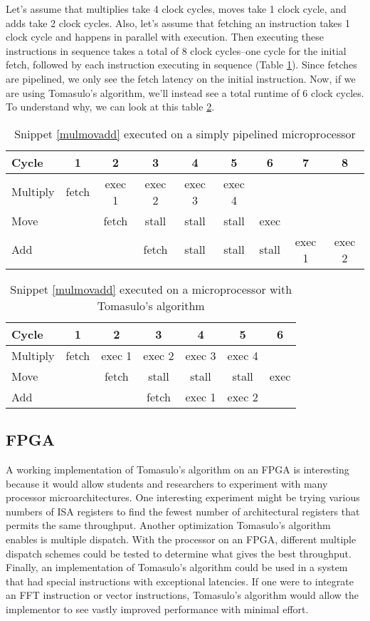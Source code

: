 \documentclass[12pt]{article}
\begin{document}
Let's assume that multiplies take 4 clock cycles, moves take 1 clock cycle, and adds take 2 clock cycles. Also, let's assume that fetching an instruction takes 1 clock cycle
and happens in parallel with execution. Then executing these instructions in sequence takes a total of 8 clock cycles--one cycle for the initial fetch, followed by each instruction
executing in sequence (Table \ref{simpleex1}). Since fetches are pipelined, we only see the fetch latency on the initial instruction. Now, if we are using Tomasulo's algorithm, we'll instead
see a total runtime of 6 clock cycles. To understand why, we can look at this table \ref{tomasuloex1}.

\begin{table}
\begin{tabular}{l || c | c | c | c | c | c | c | c}
Cycle & 1 & 2 & 3 & 4 & 5 & 6  & 7 & 8 \\ \hline
Multiply & fetch & exec 1 & exec 2 & exec 3 & exec 4 & & \\
Move & & fetch & stall & stall & stall & exec & \\
Add & & & fetch & stall & stall & stall & exec 1 & exec 2 \\
\end {tabular}
\caption{Snippet \ref{mulmovadd} executed on a simply pipelined microprocessor}
\label{simpleex1}
\end{table}

\begin{table}
\begin{tabular}{l || c | c | c | c | c | c}
Cycle & 1 & 2 & 3 & 4 & 5 & 6 \\ \hline
Multiply & fetch & exec 1 & exec 2 & exec 3 & exec 4 & \\
Move & & fetch & stall & stall & stall & exec \\
Add & & & fetch & exec 1 & exec 2 & \\
\end {tabular}
\caption{Snippet \ref{mulmovadd} executed on a microprocessor with Tomasulo's algorithm}
\label{tomasuloex1}
\end{table}

\subsection{FPGA}

A working implementation of Tomasulo's algorithm on an FPGA is interesting because it would allow students and researchers to experiment with many processor microarchitectures. One
interesting experiment might be trying various numbers of ISA registers to find the fewest number of architectural registers that permits the same throughput. Another optimization
Tomasulo's algorithm enables is multiple dispatch. With the processor on an FPGA, different multiple dispatch schemes could be tested to determine what gives the best throughput.
Finally, an implementation of Tomasulo's algorithm could be used in a system that had special instructions with exceptional latencies. If one were to integrate an FFT instruction or
vector instructions, Tomasulo's algorithm would allow the implementor to see vastly improved performance with minimal effort.
\end{document}
